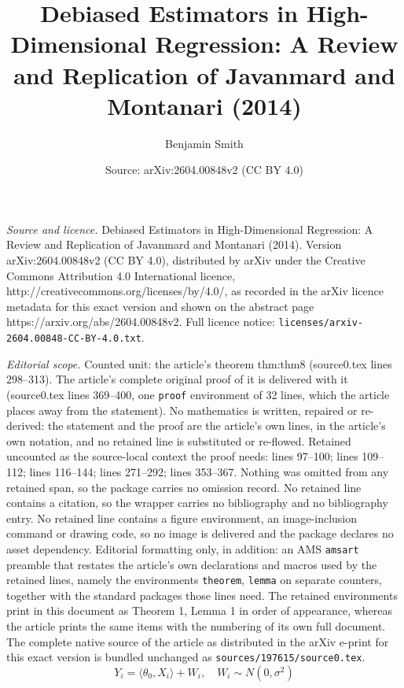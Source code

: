 \documentclass[10pt,a4paper]{amsart}
\title{Debiased Estimators in High-Dimensional Regression: A Review and Replication of Javanmard and Montanari (2014)}
\author{Benjamin Smith}
\date{Source: arXiv:2604.00848v2 (CC BY 4.0)}
\begin{document}
\maketitle

\noindent\emph{Source and licence.} Debiased Estimators in High-Dimensional Regression: A Review and Replication of Javanmard and Montanari (2014). Version arXiv:2604.00848v2 (CC BY 4.0), distributed by arXiv under the Creative Commons Attribution 4.0 International licence, http://creativecommons.org/licenses/by/4.0/, as recorded in the arXiv licence metadata for this exact version and shown on the abstract page https://arxiv.org/abs/2604.00848v2. Full licence notice: \texttt{licenses/arxiv-2604.00848-CC-BY-4.0.txt}.\par\smallskip

\noindent\textit{Editorial scope.} Counted unit: the article's theorem thm:thm8 (source0.tex lines 298--313). The article's complete original proof of it is delivered with it (source0.tex lines 369--400, one \texttt{proof} environment of 32 lines, which the article places away from the statement). No mathematics is written, repaired or re-derived: the statement and the proof are the article's own lines, in the article's own notation, and no retained line is substituted or re-flowed.  Retained uncounted as the source-local context the proof needs: lines 97--100; lines 109--112; lines 116--144; lines 271--292; lines 353--367.  Nothing was omitted from any retained span, so the package carries no omission record.  No retained line contains a citation, so the wrapper carries no bibliography and no bibliography entry.  No retained line contains a figure environment, an image-inclusion command or drawing code, so no image is delivered and the package declares no asset dependency.  Editorial formatting only, in addition: an AMS \texttt{amsart} preamble that restates the article's own declarations and macros used by the retained lines, namely the environments \texttt{theorem}, \texttt{lemma} on separate counters, together with the standard packages those lines need.  The retained environments print in this document as Theorem 1, Lemma 1 in order of appearance, whereas the article prints the same items with the numbering of its own full document.  The complete native source of the article as distributed in the arXiv e-print for this exact version is bundled unchanged as \texttt{sources/197615/source0.tex}.
\begin{equation}
    Y_i= \langle\theta_0, X_i\rangle + W_i, \quad W_i \sim N(0, \sigma^2)
    \label{eq:mod_1dim}
\end{equation}
\end{document}
